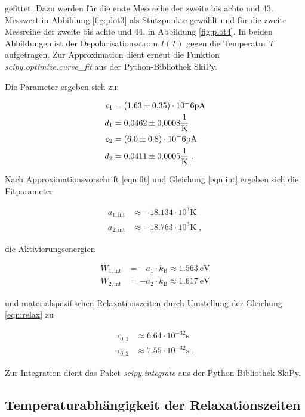 gefittet. Dazu werden für die erste Messreihe der zweite bis achte und 43. Messwert in Abbildung \ref{fig:plot3} als Stützpunkte gewählt 
und für die zweite Messreihe der zweite bis achte und 44. in Abbildung \ref{fig:plot4}.
In beiden Abbildungen ist der Depolarisationsstrom $I(T)$ gegen die Temperatur $T$ aufgetragen.
Zur Approximation dient erneut die Funktion \textit{scipy.optimize.curve\_fit} aus der Python-Bibliothek SkiPy.

Die Parameter ergeben sich zu:

\begin{align*}
  c_1 &= (\num{1.63 +- 0.35})\cdot 10^-6 \si{\pico\ampere} \\
  d_1 &= \num{0.0462 +- 0.0008} \si{\per\kelvin}\\
  c_2 &= (\num{6.0 +- 0.8})\cdot 10^-6 \si{\pico\ampere}\\
  d_2 &= \num{0.0411 +- 0.0005} \si{\per\kelvin}\; .
\end{align*}

Nach Approximationsvorschrift \eqref{eqn:fit} und Gleichung \eqref{eqn:int} ergeben sich die
Fitparameter 

\begin{align*}
  a_{1,\text{int}} &\approx \num{-18.134} \cdot 10^3 \si{\kelvin} \\
  a_{2,\text{int}} &\approx \num{-18.763} \cdot 10^3 \si{\kelvin}  \; ,
\end{align*}

die Aktivierungsenergien

\begin{align*}
  W_{1,\text{int}} &= -a_1 \cdot k_\text{B} \approx \SI{1.563}{\eV} \\
  W_{2,\text{int}} &= -a_2 \cdot k_\text{B} \approx \SI{1.617}{\eV}
\end{align*}

und materialspezifischen Relaxationszeiten durch Umstellung der Gleichung \eqref{eqn:relax} zu

\begin{align*}
  \tau_{0,1} &\approx \num{6.64} \cdot 10^{-32} \si{\second}\\
  \tau_{0,2} &\approx \num{7.55} \cdot 10^{-32} \si{\second} \; .
\end{align*}

Zur Integration dient das Paket \textit{scipy.integrate} aus der Python-Bibliothek SkiPy.

\subsection{Temperaturabhängigkeit der Relaxationszeiten}

